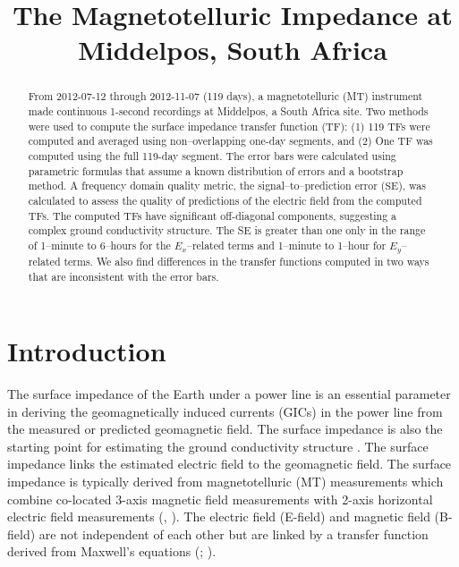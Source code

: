 \documentclass[draft,linenumbers]{agujournal2018}
\begin{document}
\title{The Magnetotelluric Impedance at Middelpos, South Africa}





\begin{abstract}
From 2012-07-12 through 2012-11-07 (119 days), a magnetotelluric (MT) instrument made continuous 1-second recordings at Middelpos, a South Africa site. Two methods were used to compute the surface impedance transfer function (TF): (1) 119 TFs were computed and averaged using non--overlapping one-day segments, and (2) One TF was computed using the full 119-day segment. The error bars were calculated using parametric formulas that assume a known distribution of errors and a bootstrap method. A frequency domain quality metric, the signal--to--prediction error ($\text{SE}$), was calculated to assess the quality of predictions of the electric field from the computed TFs. The computed TFs have significant off-diagonal components, suggesting a complex ground conductivity structure. The SE is greater than one only in the range of 1--minute to 6--hours for the $E_x$--related terms and 1--minute to 1--hour for $E_y$--related terms. We also find differences in the transfer functions computed in two ways that are inconsistent with the error bars.
\end{abstract}

\section{Introduction}

The surface impedance of the Earth under a power line is an essential parameter in deriving the geomagnetically induced currents (GICs) in the power line from the measured or predicted geomagnetic field. The surface impedance is also the starting point for estimating the ground conductivity structure \cite{Simpson2005}. The surface impedance links the estimated electric field to the geomagnetic field. The surface impedance is typically derived from magnetotelluric (MT) measurements which combine co-located 3-axis magnetic field measurements with 2-axis horizontal electric field measurements (\cite{Naido2012}, \cite{Simpson2005}). The electric field (E-field) and magnetic field (B-field) are not independent of each other but are linked by a transfer function derived from Maxwell’s equations (\cite{Vozoff1991}; \cite{Simpson2005}).
\end{document}
